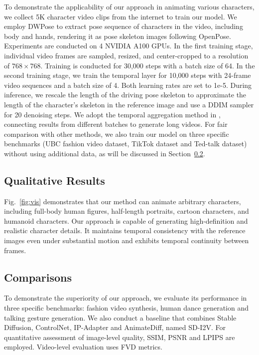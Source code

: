 To demonstrate the applicability of our approach in animating various characters, we collect 5K character video clips from the internet to train our model.
We employ DWPose\cite{dwpose} to extract pose sequence of characters in the video, including body and hands, rendering it as pose skeleton images following OpenPose\cite{openpose}. Experiments are conducted on 4 NVIDIA A100 GPUs. In the first training stage, individual video frames are sampled, resized, and center-cropped to a resolution of $768{\times}768$. Training is conducted for 30,000 steps with a batch size of 64. In the second training stage, we train the temporal layer for 10,000 steps with 24-frame video sequences and a batch size of 4. Both learning rates are set to 1e-5. During inference, we rescale the length of the driving pose skeleton to approximate the length of the character's skeleton in the reference image and use a DDIM sampler for 20 denoising steps. We adopt the temporal aggregation method in \cite{edge}, connecting results from different batches to generate long videos. For fair comparison with other methods, we also train our model on three specific benchmarks (UBC fashion video dataset\cite{dwnet}, TikTok dataset\cite{tiktok} and Ted-talk dataset\cite{mraa}) without using additional data, as will be discussed in Section~\ref{com}. 

\subsection{Qualitative Results}
Fig.~\ref{fig:vis} demonstrates that our method can animate arbitrary characters, including full-body human figures, half-length portraits, cartoon characters, and humanoid characters. Our approach is capable of generating high-definition and realistic character details. It maintains temporal consistency with the reference images even under substantial motion and exhibits temporal continuity between frames. 

\subsection{Comparisons}\label{com}

To demonstrate the superiority of our approach, we evaluate its performance in three specific benchmarks: fashion video synthesis, human dance generation and talking gesture generation. We also conduct a baseline that combines Stable Diffusion, ControlNet, IP-Adapter\cite{ip} and AnimateDiff, named SD-I2V.
For quantitative assessment of image-level quality, SSIM\cite{ssim}, PSNR\cite{psnr} and LPIPS\cite{lpips} are employed. Video-level evaluation uses FVD\cite{fvd} metrics. 

